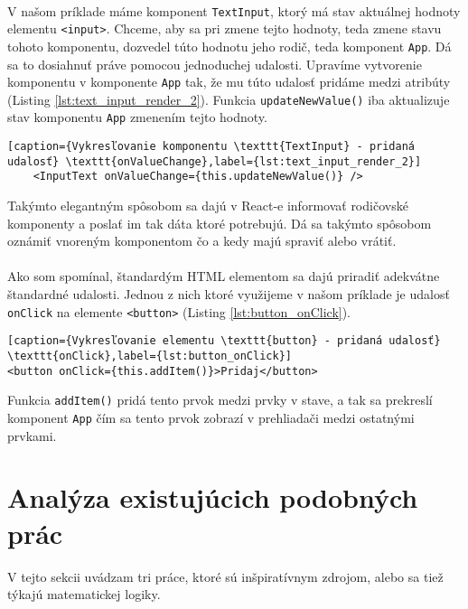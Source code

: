 \paragraph{}
V našom príklade máme komponent \texttt{TextInput}, ktorý má stav aktuálnej hodnoty elementu \texttt{<input>}. Chceme, aby sa pri zmene tejto hodnoty, teda zmene stavu tohoto komponentu, dozvedel túto hodnotu jeho rodič, teda komponent \texttt{App}. Dá sa to dosiahnuť práve pomocou jednoduchej udalosti. Upravíme vytvorenie komponentu v komponente \texttt{App} tak, že mu túto udalosť pridáme medzi atribúty (Listing \ref{lst:text_input_render_2}). Funkcia \texttt{updateNewValue()} iba aktualizuje stav komponentu \texttt{App} zmenením tejto hodnoty.
\begin{lstlisting}[caption={Vykresľovanie komponentu \texttt{TextInput} - pridaná udalosť} \texttt{onValueChange},label={lst:text_input_render_2}]
	<InputText onValueChange={this.updateNewValue()} />
\end{lstlisting}
Takýmto elegantným spôsobom sa dajú v React-e informovať rodičovské komponenty a poslať im tak dáta ktoré potrebujú. Dá sa takýmto spôsobom oznámiť vnoreným komponentom čo a kedy majú spraviť alebo vrátiť.
\paragraph{}
Ako som spomínal, štandardým HTML elementom sa dajú priradiť adekvátne štandardné udalosti. Jednou z nich ktoré využijeme v našom príklade je udalosť \texttt{onClick} na elemente \texttt{<button>} (Listing \ref{lst:button_onClick}). 
\begin{lstlisting}[caption={Vykresľovanie elementu \texttt{button} - pridaná udalosť} \texttt{onClick},label={lst:button_onClick}]
<button onClick={this.addItem()}>Pridaj</button>
\end{lstlisting}
Funkcia \texttt{addItem()} pridá tento prvok medzi prvky v stave, a tak sa prekreslí komponent \texttt{App} čím sa tento prvok zobrazí v prehliadači medzi ostatnými prvkami.






\section{Analýza existujúcich podobných prác}
V tejto sekcii uvádzam tri práce, ktoré sú inšpiratívnym zdrojom, alebo sa tiež týkajú matematickej logiky.

